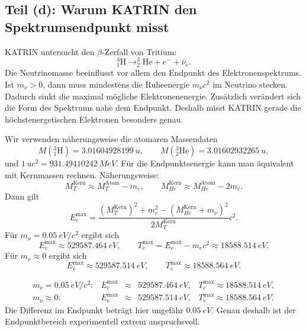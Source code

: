 \documentclass[11pt,a4paper]{scrartcl}
\newcommand{\nuclide}[3]{^{#1}_{#2}\mathrm{#3}}
\theoremstyle{definition}
\theoremstyle{plain}
\theoremstyle{remark}
\begin{document}
\subsection{Teil (d): Warum KATRIN den Spektrumsendpunkt misst}

\begin{solutionbox}
KATRIN untersucht den $\beta$-Zerfall von Tritium:
\[
    \nuclide{3}{1}{H}\longrightarrow \nuclide{3}{2}{He}+e^-+\bar\nu_e.
\]
Die Neutrinomasse beeinflusst vor allem den Endpunkt des Elektronenspektrums. Ist $m_\nu>0$, dann muss mindestens die Ruheenergie $m_\nu c^2$ im Neutrino stecken. Dadurch sinkt die maximal mögliche Elektronenenergie. Zusätzlich verändert sich die Form des Spektrums nahe dem Endpunkt. Deshalb misst KATRIN gerade die höchstenergetischen Elektronen besonders genau.
\end{solutionbox}

\begin{calculationbox}[title=Numerischer Endpunkt für Tritium]
Wir verwenden näherungsweise die atomaren Massendaten
\[
    M(\nuclide{3}{1}{H})=\SI{3.01604928199}{u},
    \qquad
    M(\nuclide{3}{2}{He})=\SI{3.01602932265}{u},
\]
und $1\,\si{u}c^2=\SI{931.49410242}{MeV}$. Für die Endpunktsenergie kann man äquivalent mit Kernmassen rechnen. Näherungsweise:
\[
    M_T^{\mathrm{Kern}}\approx M_T^{\mathrm{Atom}}-m_e,
    \qquad
    M_{He}^{\mathrm{Kern}}\approx M_{He}^{\mathrm{Atom}}-2m_e.
\]
Dann gilt
\[
    E_e^{\max}=\frac{(M_T^{\mathrm{Kern}})^2+m_e^2-(M_{He}^{\mathrm{Kern}}+m_\nu)^2}{2M_T^{\mathrm{Kern}}}c^2.
\]
Für $m_\nu=\SI{0.05}{eV\per c^2}$ ergibt sich
\[
    E_e^{\max}\approx\SI{529587.464}{eV},
    \qquad
    T_e^{\max}=E_e^{\max}-m_ec^2\approx\SI{18588.514}{eV}.
\]
Für $m_\nu\approx0$ ergibt sich
\[
    E_e^{\max}\approx\SI{529587.514}{eV},
    \qquad
    T_e^{\max}\approx\SI{18588.564}{eV}.
\]
\end{calculationbox}

\begin{answerbox}
\[
\boxed{\begin{array}{rclcl}
 m_\nu=\SI{0.05}{eV\per c^2}:& E_e^{\max}&\approx&\SI{529587.464}{eV},& T_e^{\max}\approx\SI{18588.514}{eV},\\
 m_\nu\approx0:& E_e^{\max}&\approx&\SI{529587.514}{eV},& T_e^{\max}\approx\SI{18588.564}{eV}.
\end{array}}
\]
Die Differenz im Endpunkt beträgt hier ungefähr $\SI{0.05}{eV}$. Genau deshalb ist der Endpunktbereich experimentell extrem anspruchsvoll.
\end{answerbox}
\end{document}
